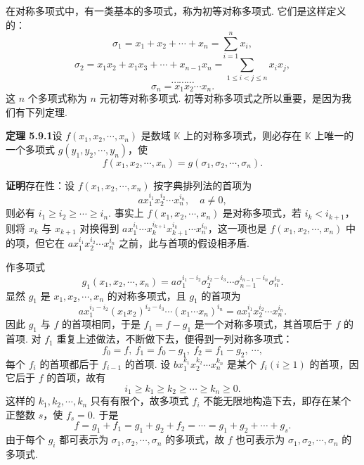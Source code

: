 \documentclass[UTF8,12pt,a4paper,fontset=fandol]{ctexart}
\begin{document}
在对称多项式中，有一类基本的多项式，称为初等对称多项式. 它们是这样定义的：
\[
\sigma_1=x_1+x_2+\cdots+x_n=\sum_{i=1}^n x_i,
\]
\[
\sigma_2=x_1x_2+x_1x_3+\cdots+x_{n-1}x_n=\sum_{1\leq i<j\leq n}x_ix_j,
\]
\[
\cdots\cdots\cdots
\]
\[
\sigma_n=x_1x_2\cdots x_n.
\]
这 $n$ 个多项式称为 $n$ 元初等对称多项式. 初等对称多项式之所以重要，是因为我们有下列定理.

\noindent\textbf{定理 5.9.1}\quad 设 $f(x_1,x_2,\cdots,x_n)$ 是数域 $\mathbb{K}$ 上的对称多项式，则必存在 $\mathbb{K}$ 上唯一的一个多项式 $g(y_1,y_2,\cdots,y_n)$，使
\[
f(x_1,x_2,\cdots,x_n)=g(\sigma_1,\sigma_2,\cdots,\sigma_n).
\]

\noindent\textbf{证明}\quad 存在性：设 $f(x_1,x_2,\cdots,x_n)$ 按字典排列法的首项为
\[
ax_1^{i_1}x_2^{i_2}\cdots x_n^{i_n},\quad a\neq 0,
\]
则必有 $i_1\geq i_2\geq \cdots\geq i_n$. 事实上 $f(x_1,x_2,\cdots,x_n)$ 是对称多项式，若 $i_k<i_{k+1}$，则将 $x_k$ 与 $x_{k+1}$ 对换得到 $ax_1^{i_1}\cdots x_k^{i_{k+1}}x_{k+1}^{i_k}\cdots x_n^{i_n}$，这一项也是 $f(x_1,x_2,\cdots,x_n)$ 中的项，但它在 $ax_1^{i_1}x_2^{i_2}\cdots x_n^{i_n}$ 之前，此与首项的假设相矛盾.

作多项式
\[
g_1(x_1,x_2,\cdots,x_n)=a\sigma_1^{i_1-i_2}\sigma_2^{i_2-i_3}\cdots\sigma_{n-1}^{i_{n-1}-i_n}\sigma_n^{i_n}.
\]
显然 $g_1$ 是 $x_1,x_2,\cdots,x_n$ 的对称多项式，且 $g_1$ 的首项为
\[
ax_1^{i_1-i_2}(x_1x_2)^{i_2-i_3}\cdots(x_1\cdots x_n)^{i_n}
=ax_1^{i_1}x_2^{i_2}\cdots x_n^{i_n}.
\]
因此 $g_1$ 与 $f$ 的首项相同，于是 $f_1=f-g_1$ 是一个对称多项式，其首项后于 $f$ 的首项. 对 $f_1$ 重复上述做法，不断做下去，便得到一列对称多项式：
\[
f_0=f,\ f_1=f_0-g_1,\ f_2=f_1-g_2,\ \cdots,
\]
每个 $f_i$ 的首项都后于 $f_{i-1}$ 的首项. 设 $bx_1^{k_1}x_2^{k_2}\cdots x_n^{k_n}$ 是某个 $f_i(i\geq 1)$ 的首项，因它后于 $f$ 的首项，故有
\[
i_1\geq k_1\geq k_2\geq \cdots\geq k_n\geq 0.
\]
这样的 $k_1,k_2,\cdots,k_n$ 只有有限个，故多项式 $f_i$ 不能无限地构造下去，即存在某个正整数 $s$，使 $f_s=0$. 于是
\[
f=g_1+f_1=g_1+g_2+f_2=\cdots=g_1+g_2+\cdots+g_s.
\]
由于每个 $g_i$ 都可表示为 $\sigma_1,\sigma_2,\cdots,\sigma_n$ 的多项式，故 $f$ 也可表示为 $\sigma_1,\sigma_2,\cdots,\sigma_n$ 的多项式.
\end{document}
